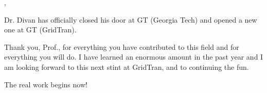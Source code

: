 

\sep

Dr. Divan has officially closed his door at GT (Georgia Tech) and opened a new one at GT (GridTran). 

Thank you, Prof., for everything you have contributed to this field and for everything you will do. I have learned an enormous amount in the past year and I am looking forward to this next stint at GridTran, and to continuing the fun.

The real work begins now!


